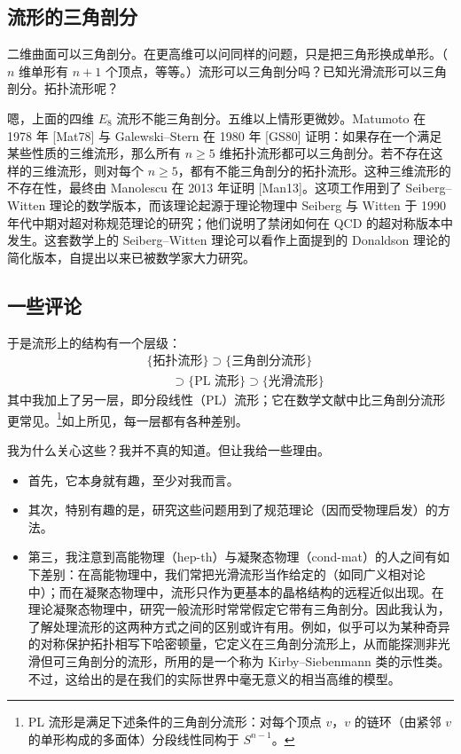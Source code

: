 \subsection{流形的三角剖分}

二维曲面可以三角剖分。在更高维可以问同样的问题，只是把三角形换成单形。（$n$ 维单形有 $n+1$ 个顶点，等等。）流形可以三角剖分吗？已知光滑流形可以三角剖分。拓扑流形呢？

嗯，上面的四维 $E_8$ 流形不能三角剖分。五维以上情形更微妙。Matumoto 在 1978 年 [Mat78] 与 Galewski--Stern 在 1980 年 [GS80] 证明：如果存在一个满足某些性质的三维流形，那么所有 $n\ge5$ 维拓扑流形都可以三角剖分。若不存在这样的三维流形，则对每个 $n\ge5$，都有不能三角剖分的拓扑流形。这种三维流形的不存在性，最终由 Manolescu 在 2013 年证明 [Man13]。这项工作用到了 Seiberg--Witten 理论的数学版本，而该理论起源于理论物理中 Seiberg 与 Witten 于 1990 年代中期对超对称规范理论的研究；他们说明了禁闭如何在 QCD 的超对称版本中发生。这套数学上的 Seiberg--Witten 理论可以看作上面提到的 Donaldson 理论的简化版本，自提出以来已被数学家大力研究。

\subsection{一些评论}

于是流形上的结构有一个层级：
\begin{equation}
\begin{aligned}
&\{\text{拓扑流形}\}\supset\{\text{三角剖分流形}\}\\
&\qquad\supset\{\text{PL 流形}\}\supset\{\text{光滑流形}\}
\end{aligned}\tag{2.52}
\end{equation}
其中我加上了另一层，即分段线性（PL）流形；它在数学文献中比三角剖分流形更常见。\footnote{PL 流形是满足下述条件的三角剖分流形：对每个顶点 $v$，$v$ 的链环（由紧邻 $v$ 的单形构成的多面体）分段线性同构于 $S^{n-1}$。}如上所见，每一层都有各种差别。

我为什么关心这些？我并不真的知道。但让我给一些理由。

\begin{itemize}
\item 首先，它本身就有趣，至少对我而言。
\item 其次，特别有趣的是，研究这些问题用到了规范理论（因而受物理启发）的方法。
\item 第三，我注意到高能物理（hep-th）与凝聚态物理（cond-mat）的人之间有如下差别：在高能物理中，我们常把光滑流形当作给定的（如同广义相对论中）；而在凝聚态物理中，流形只作为更基本的晶格结构的远程近似出现。在理论凝聚态物理中，研究一般流形时常常假定它带有三角剖分。因此我认为，了解处理流形的这两种方式之间的区别或许有用。例如，似乎可以为某种奇异的对称保护拓扑相写下哈密顿量，它定义在三角剖分流形上，从而能探测非光滑但可三角剖分的流形，所用的是一个称为 Kirby--Siebenmann 类的示性类。不过，这给出的是在我们的实际世界中毫无意义的相当高维的模型。
\end{itemize}


